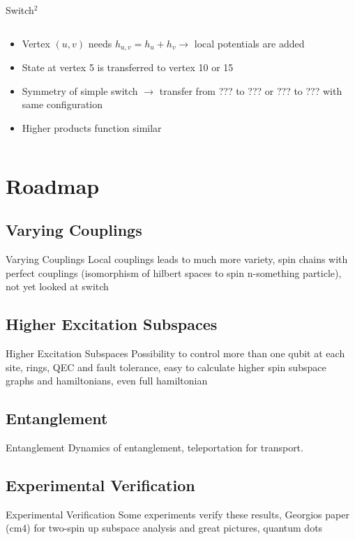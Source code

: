 \documentclass{beamer}
\begin{document}
\begin{frame}{Switch$^2$}
\begin{columns}[T]
\begin{column}{0.5\textwidth}
\begin{itemize}
    			\item Vertex $(u,v)$ needs $h_{u,v} = h_u + h_v \rightarrow $ local potentials are added
    			\item State at vertex 5 is transferred to vertex 10 or 15
    			\item Symmetry of simple switch $\rightarrow$ transfer from ??? to ??? or ??? to ??? with same configuration
    			\item Higher products function similar
    		\end{itemize}
		\end{column}
	\end{columns}
\end{frame}

\section{Roadmap}
\subsection{Varying Couplings}
\begin{frame}{Varying Couplings}
    Local couplings leads to much more variety, spin chains with perfect couplings (isomorphism of hilbert spaces to spin n-something particle), not yet looked at switch
\end{frame}

\subsection{Higher Excitation Subspaces}
\begin{frame}{Higher Excitation Subspaces}
    Possibility to control more than one qubit at each site, rings, QEC and fault tolerance, easy to calculate higher spin subspace graphs and hamiltonians, even full hamiltonian
\end{frame}

\subsection{Entanglement}
\begin{frame}{Entanglement}
    Dynamics of entanglement, teleportation for transport.
\end{frame}

\subsection{Experimental Verification}
\begin{frame}{Experimental Verification}
    Some experiments verify these results, Georgios paper (cm4) for two-spin up subspace analysis and great pictures, quantum dots
\end{frame}
\end{document}
